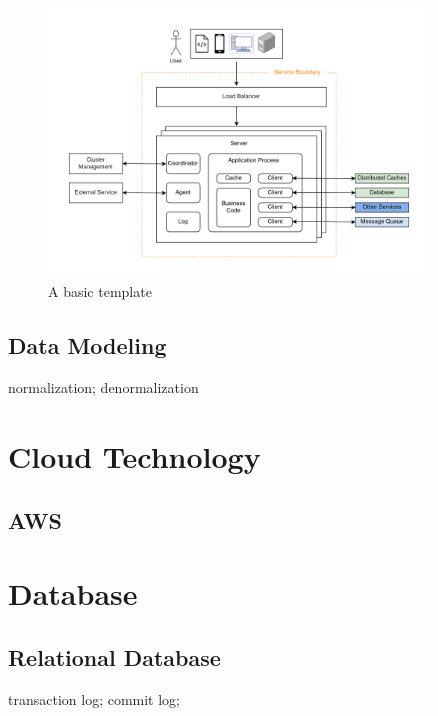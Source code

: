 \documentclass[letterpaper, oneside]{book}
\begin{document}
\begin{figure}[h]
    \centering
    \includegraphics[width=0.90\textwidth]{system_design_basic_template.png}
    \caption{A basic template}
    \label{fig:basic_template}
\end{figure}


\chapter{Data Modeling}
normalization; denormalization


\part{Cloud Technology}

\chapter{AWS}


\part{Database}

\chapter{Relational Database}
transaction log; commit log;
\end{document}
